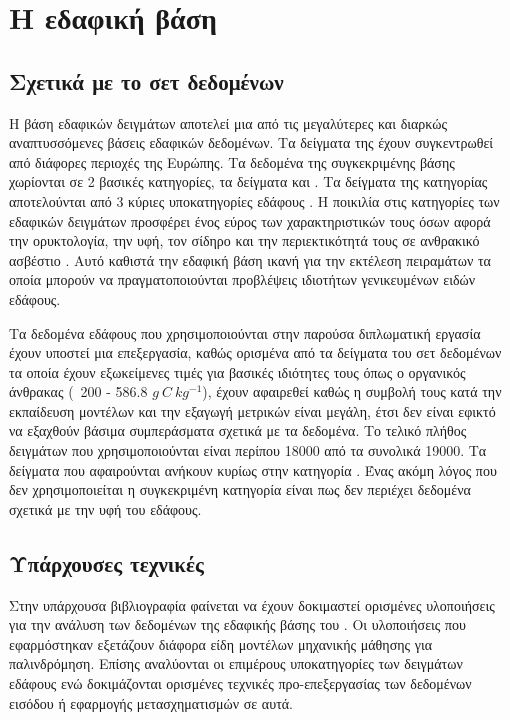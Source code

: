 \chapter{Η εδαφική βάση  }

\section{Σχετικά με το σετ δεδομένων}
Η βάση εδαφικών δειγμάτων  αποτελεί μια από τις μεγαλύτερες και διαρκώς αναπτυσσόμενες βάσεις εδαφικών δεδομένων. Τα δείγματα της έχουν συγκεντρωθεί από διάφορες περιοχές της Ευρώπης. 
Τα δεδομένα της συγκεκριμένης βάσης χωρίονται σε 2 βασικές κατηγορίες, τα δείγματα  και . Τα δείγματα της κατηγορίας  αποτελούνται από 3 κύριες υποκατηγορίες εδάφους . Η ποικιλία στις κατηγορίες των εδαφικών δειγμάτων προσφέρει ένος εύρος των χαρακτηριστικών τους όσων αφορά την ορυκτολογία, την υφή, τον σίδηρο και την περιεκτικότητά τους σε ανθρακικό ασβέστιο \cite{nocita_lucas_soil}. Αυτό καθιστά την εδαφική βάση ικανή για την εκτέλεση πειραμάτων τα οποία μπορούν να πραγματοποιούνται προβλέψεις ιδιοτήτων γενικευμένων ειδών εδάφους.

Τα δεδομένα εδάφους που χρησιμοποιούνται στην παρούσα διπλωματική εργασία έχουν υποστεί μια επεξεργασία, καθώς ορισμένα από τα δείγματα του σετ δεδομένων τα οποία έχουν εξωκείμενες τιμές για βασικές ιδιότητες τους όπως ο οργανικός άνθρακας (~200 - 586.8 $g~C~kg^{-1}$), έχουν αφαιρεθεί καθώς η συμβολή τους κατά την εκπαίδευση μοντέλων και την εξαγωγή μετρικών είναι μεγάλη, έτσι δεν είναι εφικτό να εξαχθούν βάσιμα συμπεράσματα σχετικά με τα δεδομένα. Το τελικό πλήθος δειγμάτων που χρησιμοποιούνται είναι περίπου 18000 από τα συνολικά 19000. Τα δείγματα που αφαιρούνται ανήκουν κυρίως στην κατηγορία . Ένας ακόμη λόγος που δεν χρησιμοποιείται η συγκεκριμένη κατηγορία είναι πως δεν περιέχει δεδομένα σχετικά με την υφή του εδάφους.

\section{Υπάρχουσες τεχνικές}
Στην υπάρχουσα βιβλιογραφία φαίνεται να έχουν δοκιμαστεί ορισμένες υλοποιήσεις για την ανάλυση των δεδομένων της εδαφικής βάσης του . Οι υλοποιήσεις που εφαρμόστηκαν εξετάζουν διάφορα είδη μοντέλων μηχανικής μάθησης για παλινδρόμηση. Επίσης αναλύονται οι επιμέρους υποκατηγορίες των δειγμάτων εδάφους ενώ δοκιμάζονται ορισμένες τεχνικές προ-επεξεργασίας των δεδομένων εισόδου ή εφαρμογής μετασχηματισμών σε αυτά.

